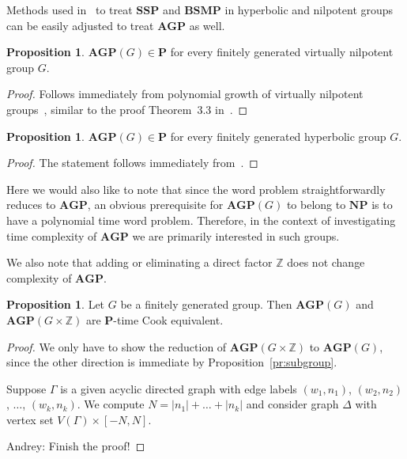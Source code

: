 \documentclass[10pt]{amsart}
\newcommand{\an}{\noindent\color{blue} Andrey: }{}
\theoremstyle{definition}
\newtheorem{proposition}[theorem]{Proposition}
\def\P{{\mathbf{P}}}
\def\NP{{\mathbf{NP}}}
\def\SSP{{\mathbf{SSP}}}
\def\BSMP{{\mathbf{BSMP}}}
\def\AGP{{\mathbf{AGP}}}
\begin{document}
Methods used in~\cite{Miasnikov-Nikolaev-Ushakov:2014a} to treat $\SSP$ and $\BSMP$ in hyperbolic and nilpotent groups can be easily adjusted to treat $\AGP$ as well.
\begin{proposition}\label{pr:agp_nilp}
$\AGP(G)\in\P$ for every finitely generated virtually nilpotent group $G$.
\end{proposition}
\begin{proof}
Follows immediately from polynomial growth of virtually nilpotent groups~\cite{Wolf}, similar to the proof Theorem~3.3 in~\cite{Miasnikov-Nikolaev-Ushakov:2014a}.
\end{proof}

\begin{proposition}\label{pr:agp_hyp}
$\AGP(G)\in\P$ for every finitely generated hyperbolic group $G$.
\end{proposition}
\begin{proof}
The statement follows immediately from~\cite[Proposition 5.5]{Miasnikov-Nikolaev-Ushakov:2014a}.
\end{proof}
Here we would also like to note that since the word problem straightforwardly reduces to $\AGP$, an obvious prerequisite for $\AGP(G)$ to belong to $\NP$ is to have a polynomial time word problem. Therefore, in the context of investigating time complexity of $\AGP$ we are primarily interested in such groups.

We also note that adding or eliminating a direct factor $\mathbb Z$ does not change complexity of $\AGP$.
\begin{proposition}\label{pr:kill_z}
Let $G$ be a finitely generated group. Then $\AGP(G)$ and $\AGP(G\times \mathbb Z)$ are $\P$-time Cook equivalent.
\end{proposition}
\begin{proof}
We only have to show the reduction of $\AGP(G\times\mathbb Z)$ to $\AGP(G)$, since the other direction is immediate by Proposition~\ref{pr:subgroup}.

Suppose $\Gamma$ is a given acyclic directed graph with edge labels $(w_1,n_1)$, $(w_2,n_2)$, $\ldots$, $(w_k,n_k)$. We compute $N=|n_1|+\ldots+|n_k|$ and consider graph $\Delta$ with vertex set $V(\Gamma)\times [-N,N]$.

{\an Finish the proof!}

\end{proof}
\end{document}

